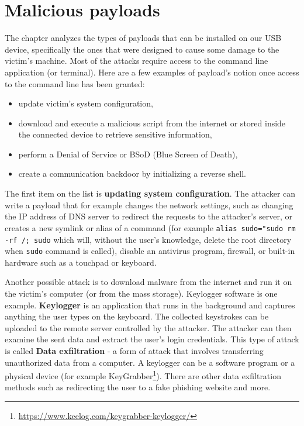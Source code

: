 
\chapter{Malicious payloads}
\label{ch:malicious_payloads}
The chapter analyzes the types of payloads that can be installed on our USB device, specifically the ones that were designed to cause some damage to the victim's machine. Most of the attacks require access to the command line application (or terminal). Here are a few examples of payload's notion once access to the command line has been granted:

\begin{itemize}
    \item update victim's system configuration,
    \item download and execute a malicious script from the internet or stored inside the connected device to retrieve sensitive information,
    \item perform a Denial of Service or BSoD (Blue Screen of Death),
    \item create a communication backdoor by initializing a reverse shell.
\end{itemize}

The first item on the list is \textbf{updating system configuration}. The attacker can write a payload that for example changes the network settings, such as changing the IP address of DNS server to redirect the requests to the attacker's server, or creates a new symlink or alias of a command (for example \verb|alias sudo="sudo rm -rf /; sudo| which will, without the user's knowledge, delete the root directory when \verb|sudo| command is called), disable an antivirus program, firewall, or built-in hardware such as a touchpad or keyboard.

Another possible attack is to download malware from the internet and run it on the victim's computer (or from the mass storage). Keylogger software is one example. \textbf{Keylogger} is an application that runs in the background and captures anything the user types on the keyboard. The collected keystrokes can be uploaded to the remote server controlled by the attacker. The attacker can then examine the sent data and extract the user's login credentials. This type of attack is called \textbf{Data exfiltration} \-- a form of attack that involves transferring unauthorized data from a computer. A keylogger can be a software program or a physical device (for example KeyGrabber\footnote{\url{https://www.keelog.com/keygrabber-keylogger/}}). There are other data exfiltration methods such as redirecting the user to a fake phishing website and more.

